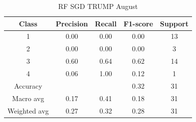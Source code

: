 \begin{enumerate}
\begin{enumerate}
\begin{table}[H]
                \vspace{1em}
                
                \scriptsize
                \begin{tabular}{c|cccc}
                \hline
                Class & Precision & Recall & F1-score & Support \\
                \hline
                1 & 0.00 & 0.00 & 0.00 & 13 \\
                2 & 0.00 & 0.00 & 0.00 & 3 \\
                3 & 0.60 & 0.64 & 0.62 & 14 \\
                4 & 0.06 & 1.00 & 0.12 & 1 \\
                \hline
                Accuracy &       &      & 0.32 & 31 \\
                Macro avg & 0.17 & 0.41 & 0.18 & 31 \\
                Weighted avg & 0.27 & 0.32 & 0.28 & 31 \\
                \hline
                \end{tabular}
                \caption{RF SGD TRUMP August}
                \label{tab:classifier_2_report_rf_sgd_trump_non_filtered_aug}
                \end{table}


    
    
                
            \end{enumerate}
            
    \end{enumerate}

    \pagebreak

